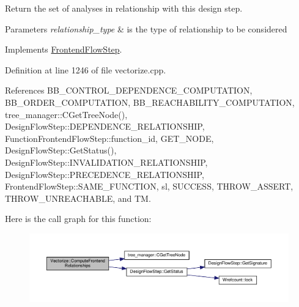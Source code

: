 Return the set of analyses in relationship with this design step. 


\begin{DoxyParams}{Parameters}
{\em relationship\+\_\+type} & is the type of relationship to be considered \\
\hline
\end{DoxyParams}


Implements \hyperlink{classFrontendFlowStep_abeaff70b59734e462d347ed343dd700d}{Frontend\+Flow\+Step}.



Definition at line 1246 of file vectorize.\+cpp.



References B\+B\+\_\+\+C\+O\+N\+T\+R\+O\+L\+\_\+\+D\+E\+P\+E\+N\+D\+E\+N\+C\+E\+\_\+\+C\+O\+M\+P\+U\+T\+A\+T\+I\+ON, B\+B\+\_\+\+O\+R\+D\+E\+R\+\_\+\+C\+O\+M\+P\+U\+T\+A\+T\+I\+ON, B\+B\+\_\+\+R\+E\+A\+C\+H\+A\+B\+I\+L\+I\+T\+Y\+\_\+\+C\+O\+M\+P\+U\+T\+A\+T\+I\+ON, tree\+\_\+manager\+::\+C\+Get\+Tree\+Node(), Design\+Flow\+Step\+::\+D\+E\+P\+E\+N\+D\+E\+N\+C\+E\+\_\+\+R\+E\+L\+A\+T\+I\+O\+N\+S\+H\+IP, Function\+Frontend\+Flow\+Step\+::function\+\_\+id, G\+E\+T\+\_\+\+N\+O\+DE, Design\+Flow\+Step\+::\+Get\+Status(), Design\+Flow\+Step\+::\+I\+N\+V\+A\+L\+I\+D\+A\+T\+I\+O\+N\+\_\+\+R\+E\+L\+A\+T\+I\+O\+N\+S\+H\+IP, Design\+Flow\+Step\+::\+P\+R\+E\+C\+E\+D\+E\+N\+C\+E\+\_\+\+R\+E\+L\+A\+T\+I\+O\+N\+S\+H\+IP, Frontend\+Flow\+Step\+::\+S\+A\+M\+E\+\_\+\+F\+U\+N\+C\+T\+I\+ON, sl, S\+U\+C\+C\+E\+SS, T\+H\+R\+O\+W\+\_\+\+A\+S\+S\+E\+RT, T\+H\+R\+O\+W\+\_\+\+U\+N\+R\+E\+A\+C\+H\+A\+B\+LE, and TM.

Here is the call graph for this function\+:
\nopagebreak
\begin{figure}[H]
\begin{center}
\leavevmode
\includegraphics[width=350pt]{d5/da5/classVectorize_a949af411d288a13db50925106f15054c_cgraph}
\end{center}
\end{figure}
\mbox{\label{classVectorize_ae0735ec00e07e40a9bc81fce55521bfc}} 
